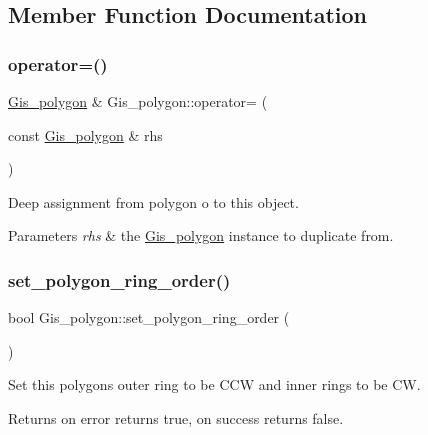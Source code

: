 \subsection{Member Function Documentation}
\mbox{\label{classGis__polygon_a939b261fcd715c924a5a33dfa579c6e1}} 
\subsubsection{\texorpdfstring{operator=()}{operator=()}}
{\footnotesize\ttfamily \mbox{\hyperlink{classGis__polygon}{Gis\+\_\+polygon}} \& Gis\+\_\+polygon\+::operator= (\begin{DoxyParamCaption}\item[{const \mbox{\hyperlink{classGis__polygon}{Gis\+\_\+polygon}} \&}]{rhs }\end{DoxyParamCaption})}

Deep assignment from polygon \textquotesingle{}o\textquotesingle{} to this object. 
\begin{DoxyParams}{Parameters}
{\em rhs} & the \mbox{\hyperlink{classGis__polygon}{Gis\+\_\+polygon}} instance to duplicate from. \\
\hline
\end{DoxyParams}
\mbox{\label{classGis__polygon_affcf00a3922cccdded80d21b59ee6634}} 
\subsubsection{\texorpdfstring{set\+\_\+polygon\+\_\+ring\+\_\+order()}{set\_polygon\_ring\_order()}}
{\footnotesize\ttfamily bool Gis\+\_\+polygon\+::set\+\_\+polygon\+\_\+ring\+\_\+order (\begin{DoxyParamCaption}{ }\end{DoxyParamCaption})}

Set this polygon\textquotesingle{}s outer ring to be C\+CW and inner rings to be CW. \begin{DoxyReturn}{Returns}
on error returns true, on success returns false. 
\end{DoxyReturn}
\mbox{\label{classGis__polygon_a68ca304142cc018fe18788b3a1662093}} 
